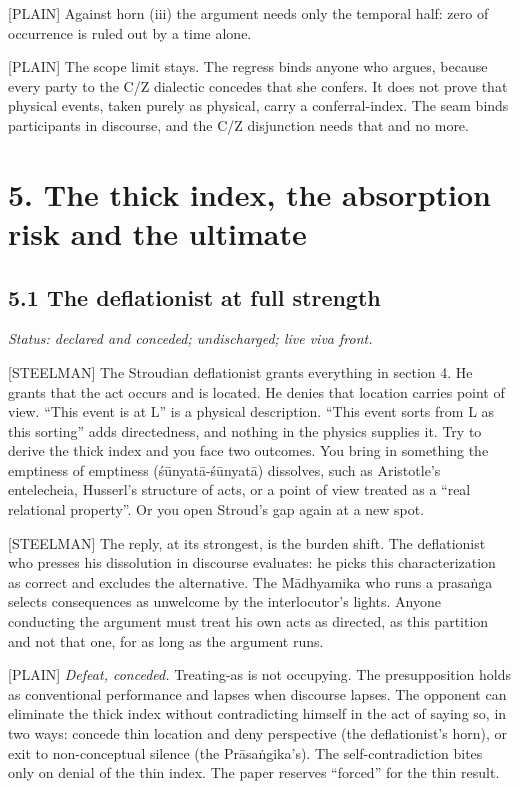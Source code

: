 \documentclass[11pt]{article}
\newcommand{\register}[1]{{\ttfamily\small #1}}
\begin{document}
\register{[PLAIN]} Against horn (iii) the argument needs only the temporal half: zero of occurrence is ruled out by a time alone.

\register{[PLAIN]} The scope limit stays. The regress binds anyone who argues, because every party to the C/\allowbreak{}Z dialectic concedes that she confers. It does not prove that physical events, taken purely as physical, carry a conferral-index. The seam binds participants in discourse, and the C/\allowbreak{}Z disjunction needs that and no more.

\section*{5. The thick index, the absorption risk and the ultimate}

\subsection*{5.1 The deflationist at full strength}

\emph{Status: declared and conceded; undischarged; live viva front.}

\register{[STEELMAN]} The Stroudian deflationist grants everything in section 4. He grants that the act occurs and is located. He denies that location carries point of view. ``This event is at L'' is a physical description. ``This event sorts from L as this sorting'' adds directedness, and nothing in the physics supplies it. Try to derive the thick index and you face two outcomes. You bring in something the emptiness of emptiness (śūnyatā-śūnyatā) dissolves, such as Aristotle's entelecheia, Husserl's structure of acts, or a point of view treated as a ``real relational property''. Or you open Stroud's gap again at a new spot.

\register{[STEELMAN]} The reply, at its strongest, is the burden shift. The deflationist who presses his dissolution in discourse evaluates: he picks this characterization as correct and excludes the alternative. The Mādhyamika who runs a prasaṅga selects consequences as unwelcome by the interlocutor's lights. Anyone conducting the argument must treat his own acts as directed, as this partition and not that one, for as long as the argument runs.

\register{[PLAIN]} \emph{Defeat, conceded.} Treating-as is not occupying. The presupposition holds as conventional performance and lapses when discourse lapses. The opponent can eliminate the thick index without contradicting himself in the act of saying so, in two ways: concede thin location and deny perspective (the deflationist's horn), or exit to non-conceptual silence (the Prāsaṅgika's). The self-contradiction bites only on denial of the thin index. The paper reserves ``forced'' for the thin result.
\end{document}
